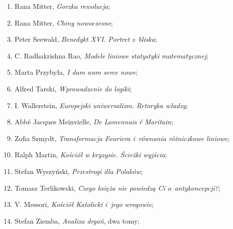 \documentclass[a4paper,11pt]{article}
\begin{document}
\begin{enumerate}
\item Rana Mitter, \textit{Gorzka rewolucja};



\item Rana Mitter, \textit{Chiny nowoczesne};



\item Peter Seewald, \textit{Benedykt XVI. Portret z~bliska};



\item C. Radhakrishna Rao, \textit{Modele liniowe statystyki matematycznej};



\item Marta Przybyła, \textit{I dam wam serce nowe};



\item Alfred Tarski, \textit{Wprowadzenie do logiki};



\item I. Wallerstein, \textit{Europejski uniwersalizm. Retoryka władzy};



\item Abbé Jacques Meinvielle, \textit{De Lamennais ŕ Maritain};



\item Zofia Szmydt, \textit{Transformacja Fouriera i~równania różniczkowe
    liniowe};



\item Ralph Martin, \textit{Kościół w kryzysie. Ścieżki wyjścia};



\item Stefan Wyszyński, \textit{Przestrogi dla Polaków};



\item Tomasz Terlikowski, \textit{Czego księża nie powiedzą Ci
    o~antykoncepcji?};



\item V. Messori, \textit{Kościół Katolicki i~jego wrogowie};



\item Stefan Ziemba, \textit{Analiza drgań}, dwa tomy;




\end{enumerate}
\end{document}
